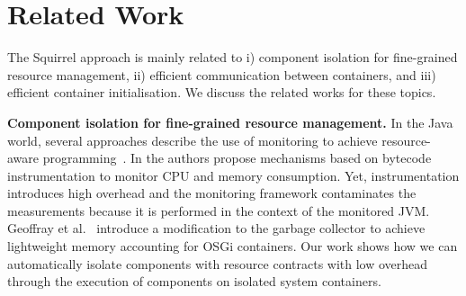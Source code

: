 

\section{Related Work} \label{sec:related-works}

The Squirrel approach is mainly related to i) component isolation for fine-grained resource management, ii) efficient communication between containers, and iii) efficient container initialisation. We discuss the related works for these topics. 

	

\textbf{Component isolation for fine-grained resource management.}
In the Java world, several approaches describe the use of monitoring to achieve resource-aware programming~\cite{Guidec:2003:JMP,Maurel:2012:AME:2304736.2304763,Moreau:2005:RAP}.
In \cite{binder_portable_2006,Hulaas:2008:PTL} the authors propose mechanisms based on bytecode instrumentation to monitor CPU and memory consumption.
Yet, instrumentation introduces high overhead and the monitoring framework contaminates the measurements
because it is performed in the context of the monitored JVM.
Geoffray et al.~\cite{Geoffray:2009:I-JVM} introduce a modification to the garbage collector to achieve lightweight memory accounting for OSGi containers.
Our work shows how we can automatically isolate components with resource contracts with low overhead through the execution of components on isolated system containers.

